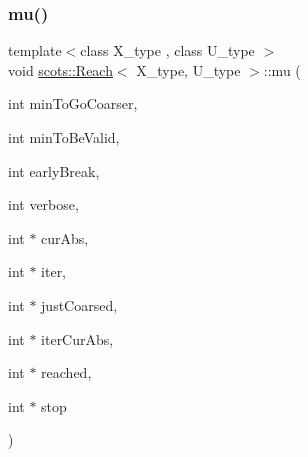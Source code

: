 \subsubsection{\texorpdfstring{mu()}{mu()}}
{\footnotesize\ttfamily template$<$class X\+\_\+type , class U\+\_\+type $>$ \\
void \hyperlink{classscots_1_1Reach}{scots\+::\+Reach}$<$ X\+\_\+type, U\+\_\+type $>$\+::mu (\begin{DoxyParamCaption}\item[{int}]{min\+To\+Go\+Coarser,  }\item[{int}]{min\+To\+Be\+Valid,  }\item[{int}]{early\+Break,  }\item[{int}]{verbose,  }\item[{int $\ast$}]{cur\+Abs,  }\item[{int $\ast$}]{iter,  }\item[{int $\ast$}]{just\+Coarsed,  }\item[{int $\ast$}]{iter\+Cur\+Abs,  }\item[{int $\ast$}]{reached,  }\item[{int $\ast$}]{stop }\end{DoxyParamCaption})\hspace{0.3cm}{\ttfamily [inline]}}

